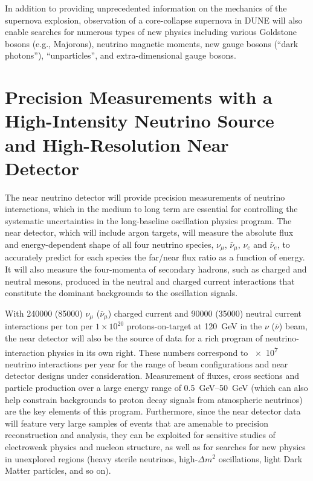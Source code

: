 In addition to providing unprecedented information on the mechanics of
the supernova explosion, observation of a core-collapse supernova in
DUNE will also enable searches for numerous types of new physics
including various Goldstone bosons (e.g., Majorons), neutrino magnetic
moments, new gauge bosons (``dark photons''), ``unparticles'', and
extra-dimensional gauge bosons.

%
%
\section{Precision Measurements with a High-Intensity Neutrino Source and High-Resolution Near Detector}


The near neutrino detector will provide precision measurements of
neutrino interactions, which in the medium to long term are essential
for controlling the systematic uncertainties in the long-baseline
oscillation physics program.  The near detector, which will include
argon targets, will measure the absolute flux and energy-dependent
shape of all four neutrino species, $\nu_\mu$, $\bar{\nu}_{\mu}$,
$\nu_e$ and $\bar{\nu}_e$, to accurately predict for each species the
far/near flux ratio as a function of energy.  It will also measure the
four-momenta of secondary hadrons, such as charged and neutral mesons,
produced in the neutral and charged current interactions that
constitute the dominant backgrounds to the oscillation signals.

With  \num{240000} (\num{85000}) $\nu_\mu$ ($\overline{\nu}_\mu$) charged current 
and \num{90000} (\num{35000})  neutral current interactions per ton per $1 \times 10^{20}$
protons-on-target at \SI{120}{GeV}  in the $\nu$ ($\overline\nu$) beam, the near detector
will also be the source of data for a rich program of neutrino-interaction 
physics in its own right.  These numbers correspond to
\num{e7}  neutrino interactions per year for the range of beam
configurations and near detector designs under consideration.
Measurement of fluxes, cross sections and particle production over a
large energy range of \SIrange{0.5}{50}{\GeV} (which can also help constrain
backgrounds to proton decay signals from atmospheric neutrinos) are the key
elements of this program.  
Furthermore, since the near detector data will feature very large
samples of events that are amenable to precision reconstruction and
analysis, they can be exploited for sensitive studies of electroweak
physics and nucleon structure, as well as for searches for new physics
in unexplored regions (heavy sterile neutrinos, high-$\Delta m^2$
oscillations, light Dark Matter particles, and so on). 

